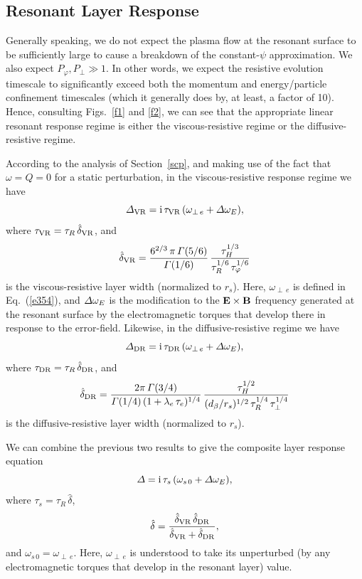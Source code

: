 \documentclass[12pt,prb,aps]{revtex4-1}
\begin{document}
\subsection{Resonant Layer Response}
Generally speaking, we do not expect the plasma flow at the resonant surface to be sufficiently
large to cause a breakdown of the constant-$\psi$ approximation. We also expect $P_\varphi, P_\perp \gg 1$. In other
words, we expect the resistive evolution timescale to significantly exceed both the momentum and energy/particle
confinement timescales (which it generally does by, at least, a factor of 10). Hence, consulting Figs.~\ref{f1} and \ref{f2},
we can see that the appropriate linear resonant response regime is either the viscous-resistive regime or the diffusive-resistive
regime. 

According to the analysis of Section~\ref{scp}, and making use of the fact that $\omega=Q=0$ for a static perturbation, 
in the viscous-resistive response regime we have
\begin{equation}
{\mit\Delta}_{\rm VR} = {\rm i}\,\tau_{\rm VR}\,(\omega_{\perp\,e}+{\mit\Delta}\omega_E),
\end{equation}
where $\tau_{\rm VR} = \tau_R\,\hat{\delta}_{\rm VR}$, and
\begin{equation}
\hat{\delta}_{\rm VR} = \frac{6^{2/3}\,\pi\,{\mit\Gamma}(5/6)}{{\mit\Gamma}(1/6)}\,\frac{\tau_H^{1/3}}{\tau_R^{1/6}\,\tau_\varphi^{1/6}}
\end{equation}
is the viscous-resistive layer width (normalized to $r_s$). Here, $\omega_{\perp\,e}$ is defined in Eq.~(\ref{e354}), and
${\mit\Delta}\omega_E$ is the modification to the ${\bf E}\times{\bf B}$ frequency generated at the resonant surface by
the electromagnetic torques that develop there in response to the error-field. Likewise, in the
diffusive-resistive regime we have
\begin{equation}
{\mit\Delta}_{\rm DR} = {\rm i}\,\tau_{\rm DR}\,(\omega_{\perp\,e}+{\mit\Delta}\omega_E),
\end{equation}
where $\tau_{\rm DR} = \tau_R\,\hat{\delta}_{\rm DR}$, and
\begin{equation}
\hat{\delta}_{\rm DR} = \frac{2\pi\,{\mit\Gamma}(3/4)}{{\mit\Gamma}(1/4)\,(1+\lambda_e\,\tau_e)^{1/4}}\,
\frac{\tau_H^{1/2}}{(d_\beta/r_s)^{1/2}\,\tau_R^{1/4}\,\tau_\perp^{1/4}}
\end{equation}
is the diffusive-resistive layer width (normalized to $r_s$).

We can combine the previous two results to give the composite layer response equation
\begin{equation}\label{e389}
{\mit\Delta} = {\rm i}\,\tau_s\,(\omega_{s\,0}+ {\mit\Delta}\omega_E),
\end{equation}
where $\tau_s=\tau_R\,\hat{\delta}$, 
\begin{equation}
\hat{\delta} = \frac{\hat{\delta}_{\rm VR}\,\hat{\delta}_{\rm DR}}{\hat{\delta}_{\rm VR} + \hat{\delta}_{\rm DR}},
\end{equation}
and 
$\omega_{s\,0}= \omega_{\perp\,e}$.
Here, $\omega_{\perp\,e}$ is understood to take its unperturbed (by any electromagnetic torques that
develop in the resonant layer) value. 
\end{document}

